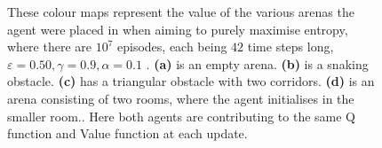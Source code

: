 \documentclass{article}
\begin{document}
\begin{figure}[ht]
\centering
{}
\caption{These colour maps represent the value of the various arenas the agent were placed in when aiming to purely maximise entropy, where there are $10^7$ episodes, each being $42$ time steps long, $\varepsilon = 0.50, \gamma = 0.9, \alpha = 0.1$ . \textbf{(a)} is an empty arena. \textbf{(b)} is a snaking obstacle. \textbf{(c)} has a triangular obstacle with two corridors. \textbf{(d)} is an arena consisting of two rooms, where the agent initialises in the smaller room.\label{social}. Here both agents are contributing to the same Q function and Value function at each update.}
\end{figure}

\end{document}
